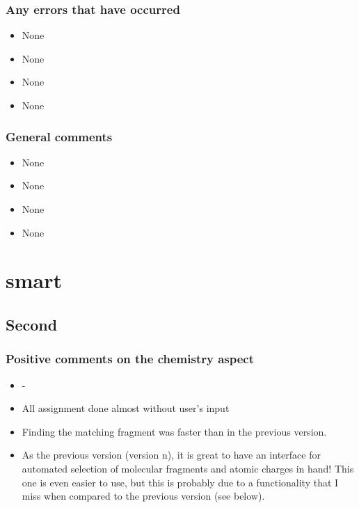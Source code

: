 \subsubsection{Any errors that have occurred}
\begin{itemize}
\item None

\item None

\item None

\item None

\end{itemize}


\subsubsection{General comments}
\begin{itemize}
\item None

\item None

\item None

\item None

\end{itemize}


\section{\oframp{} smart}
\subsection{Second}
\subsubsection{Positive comments on the chemistry aspect}
\begin{itemize}
\item -

\item All assignment done almost without user's input

\item Finding the matching fragment was faster than in the previous version.

\item As the previous version (version n), it is great to have an interface for automated selection of molecular fragments and atomic charges in hand! This one is even easier to use, but this is probably due to a functionality that I miss when compared to the previous version (see below).

\end{itemize}


